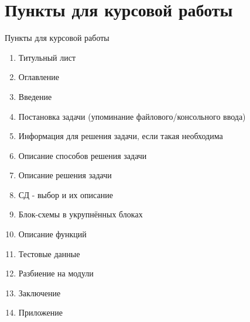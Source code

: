 \documentclass[12pt,a4paper]{article}
\begin{document}
\section{Пункты для курсовой работы}{
\begin{center}
Пункты для курсовой работы
\end{center}
\begin{enumerate}
\item Титульный лист
\item Оглавление
\item Введение
\item Постановка задачи (упоминание файлового/консольного ввода)
\item Информация для решения задачи, если такая необходима
\item Описание способов решения задачи
\item Описание решения задачи
\item СД - выбор и их описание
\item Блок-схемы в укрупнённых блоках
\item Описание функций
\item Тестовые данные
\item Разбиение на модули
\item Заключение
\item Приложение
\end{enumerate}
}
\end{document}
